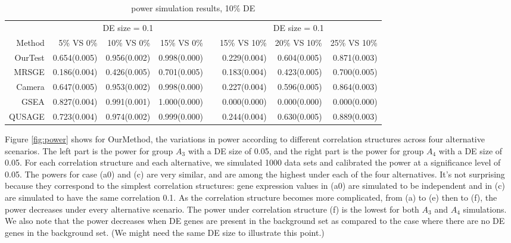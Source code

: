 \documentclass[11pt, a4paper]{article}
\begin{document}
	
	\begin{table}
		\centering
		 \caption{power simulation results, 10\% DE }\label{table:power}
		 	\begin{tabular}{rrrr c rrr}
		 		\hline\hline
		  & \multicolumn{3}{c}{DE size = 0.1} &  & \multicolumn{3}{c}{DE size = 0.1} \\
		 	Method & 5\% VS 0\% & 10\% VS 0\% & 15\% VS 0\%	 & & 15\% VS 10\% & 20\% VS 10\% & 25\% VS 10\% \\ 
		 	 \cline{2-4}   \cline{6-8}
		 	OurTest & 0.654(0.005) & 0.956(0.002) & 0.998(0.000) & & 0.229(0.004) & 0.604(0.005) & 0.871(0.003)\\ 
		 	MRSGE & 0.186(0.004) & 0.426(0.005) & 0.701(0.005)& & 0.183(0.004) & 0.423(0.005) & 0.700(0.005) \\ 
		 	Camera & 0.647(0.005) & 0.953(0.002) & 0.998(0.000)& & 0.227(0.004) & 0.596(0.005) & 0.864(0.003)  \\ 
		 	GSEA & 0.827(0.004) & 0.991(0.001) & 1.000(0.000) & & 0.000(0.000) & 0.000(0.000) & 0.000(0.000) \\ 
		 	QUSAGE & 0.723(0.004) & 0.974(0.002) & 0.999(0.000) & &  0.244(0.004) & 0.630(0.005) & 0.889(0.003) \\ 
		\hline
	\end{tabular}
\end{table}

	
	
		Figure \ref{fig:power} shows for OurMethod, the variations in power according to different correlation structures across four alternative scenarios. The left part is the power for group $A_3$ with a DE size of 0.05, and the right part is the power for group $A_4$ with a DE size of 0.05. For each correlation structure and each alternative, we simulated 1000 data sets and calibrated the power at a significance level of 0.05. 
		The powers for case (a0) and (c) are very similar, and are among the highest under each of the four alternatives. It's not surprising because they correspond to the simplest correlation structures: gene expression values in (a0) are simulated to be independent and in (c) are simulated to have the same correlation 0.1. As the correlation structure becomes more complicated, from (a) to (e) then to (f), the power decreases under every alternative scenario. The power under correlation structure (f) is the lowest for both $A_3$ and $A_4$ simulations. We also note that the power decreases when DE genes are present in the background set as compared to the case where there are no DE genes in the background set. (We might need the same DE size to illustrate this point.)
		
\end{document}

